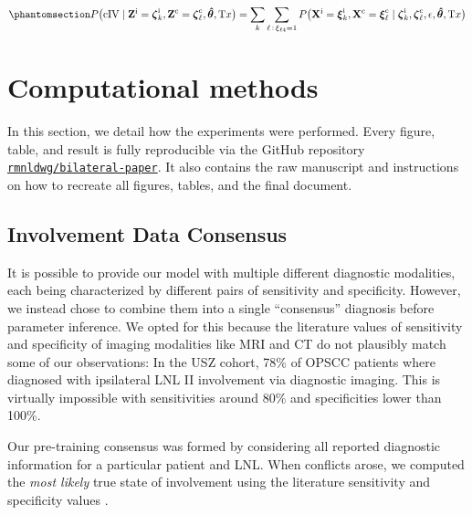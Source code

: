 \documentclass[
  sn-mathphys-num,
]{sn-jnl}
\begin{document}
\begin{equation}\phantomsection\label{eq-marg-over-posterior}{
P \big( \text{cIV} \mid \mathbf{Z}^\text{i}=\boldsymbol{\zeta}^\text{i}_k, \mathbf{Z}^\text{c}=\boldsymbol{\zeta}^\text{c}_\ell, \boldsymbol{\hat{\theta}}, \text{T}x \big) = \sum_k \sum_{\ell \, : \, \xi_{\ell 4}=1} P \big( \mathbf{X}^\text{i} = \boldsymbol{\xi}^\text{i}_k, \mathbf{X}^\text{c} = \boldsymbol{\xi}^\text{c}_\ell \mid \boldsymbol{\zeta}^\text{i}_k, \boldsymbol{\zeta}^\text{c}_\ell, \epsilon, \boldsymbol{\hat{\theta}}, \text{T}x \big)
}\end{equation}

\section{Computational methods}\label{sec-methods}

In this section, we detail how the experiments were performed. Every
figure, table, and result is fully reproducible via the GitHub
repository
\href{https://github.com/rmnldwg/bilateral-paper}{\texttt{rmnldwg/bilateral-paper}}.
It also contains the raw manuscript and instructions on how to recreate
all figures, tables, and the final document.

\subsection{Involvement Data
Consensus}\label{involvement-data-consensus}

It is possible to provide our model with multiple different diagnostic
modalities, each being characterized by different pairs of sensitivity
and specificity. However, we instead chose to combine them into a single
``consensus'' diagnosis before parameter inference. We opted for this
because the literature values of sensitivity and specificity
\citep{de_bondt_detection_2007, kyzas_18f-fluorodeoxyglucose_2008} of
imaging modalities like MRI and CT do not plausibly match some of our
observations: In the USZ cohort, 78\% of OPSCC patients where diagnosed
with ipsilateral LNL II involvement via diagnostic imaging. This is
virtually impossible with sensitivities around 80\% and specificities
lower than 100\%.

Our pre-training consensus was formed by considering all reported
diagnostic information for a particular patient and LNL. When conflicts
arose, we computed the \emph{most likely} true state of involvement
using the literature sensitivity and specificity values
\citep{de_bondt_detection_2007, kyzas_18f-fluorodeoxyglucose_2008}.
\end{document}
